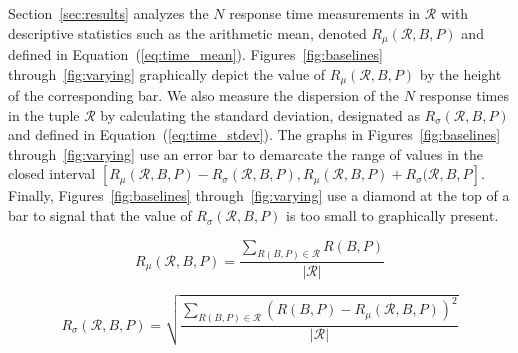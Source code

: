 \documentclass{sig-alternate}
\begin{document}


Section~\ref{sec:results} analyzes the $N$ response time measurements
in $\mathcal{R}$ with descriptive statistics such as the arithmetic
mean, denoted $R_\mu (\mathcal{R}, B, P)$ and defined in
Equation~(\ref{eq:time_mean}).  Figures~\ref{fig:baselines}
through~\ref{fig:varying} graphically depict the value of
$R_\mu(\mathcal{R}, B,P)$ by the height of the corresponding bar.  We
also measure the dispersion of the $N$ response times in the tuple
$\mathcal{R}$ by calculating the standard deviation, designated as
$R_\sigma (\mathcal{R}, B, P)$ and defined in
Equation~(\ref{eq:time_stdev}).  The graphs in
Figures~\ref{fig:baselines} through~\ref{fig:varying} use an error bar
to demarcate the range of values in the closed interval
$[R_\mu(\mathcal{R}, B,P)-R_\sigma (\mathcal{R}, B, P),
  R_\mu(\mathcal{R}, B,P)+R_\sigma (\mathcal{R}, B, P]$. Finally,
Figures~\ref{fig:baselines} through~\ref{fig:varying} use a diamond at
the top of a bar to signal that the value of $R_\sigma (\mathcal{R},
B, P)$ is too small to graphically present.

\vspace*{-.1in}

\begin{equation} \label{eq:time_mean}
R_\mu (\mathcal{R}, B, P) = \frac{\displaystyle \sum_{R(B,P) \in \mathcal{R}} R(B,P)}{|\mathcal{R}|}
\end{equation}

\vspace*{-.05in}

\begin{equation} \label{eq:time_stdev}
R_\sigma (\mathcal{R}, B, P) = 
      \sqrt{\frac{\displaystyle \sum_{R(B,P) \in \mathcal{R}} 
                                (R(B,P) - R_\mu (\mathcal{R}, B, P))^2}
                 {|\mathcal{R}|}}
\end{equation}
\end{document}

